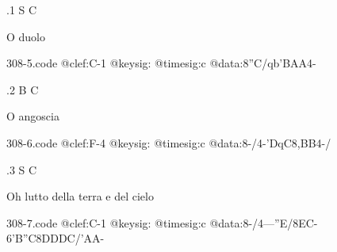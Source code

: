 \documentclass[twocolumn]{book}
\begin{document}
.1  S  C
\newline \begin{footnotesize} O duolo \end{footnotesize}  
\begin{filecontents*}{308-5.code}
@clef:C-1
@keysig:
@timesig:c
@data:8''C/qb'BAA4-
\end{filecontents*}
\newline
%

.2  B  C
\newline \begin{footnotesize} O angoscia \end{footnotesize}  
\begin{filecontents*}{308-6.code}
@clef:F-4
@keysig:
@timesig:c
@data:8-/4-'DqC8,BB4-/
\end{filecontents*}
\newline
%

.3  S  C
\newline \begin{footnotesize} Oh lutto della terra e del cielo \end{footnotesize}  
\begin{filecontents*}{308-7.code}
@clef:C-1
@keysig:
@timesig:c
@data:8-/4---''E/8EC-6'B''C8DDDC/'AA-
\end{filecontents*}
\newline
%
\end{document}
